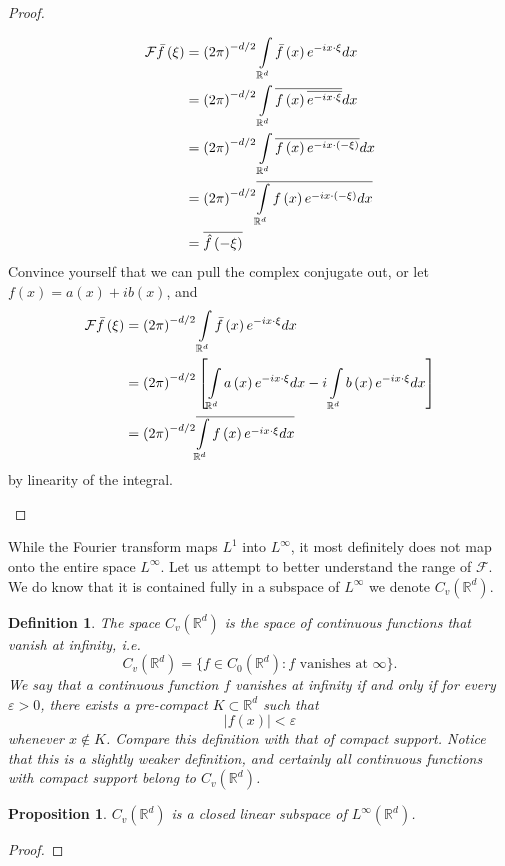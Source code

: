 \documentclass[letterpaper,twoside,12pt]{article}
\theoremstyle{mystyle}
\newtheorem{definition}{Definition}[section]
\newtheorem{prop}{Proposition}[section]
\newcommand{\R}{{\mathbb R}}
\newcommand{\cg}{\color{gray}}
\newcommand{\cbk}{\color{black}}
\begin{document}
\begin{proof}
\begin{enumerate}
\begin{align*}
      \mathcal{F}\bar f\left( \xi  \right) &= {\left( {2\pi } \right)^{ - d/2}}\int\limits_{{\mathbb{R}^d}} {\bar f\left( x \right){e^{ - ix \cdot \xi }}dx}  \hfill \\
       &= {\left( {2\pi } \right)^{ - d/2}}\int\limits_{{\mathbb{R}^d}} {\overline {f\left( x \right)\overline {{e^{ - ix \cdot \xi }}} } dx}  \hfill \\
       &= {\left( {2\pi } \right)^{ - d/2}}\int\limits_{{\mathbb{R}^d}} {\overline {f\left( x \right){e^{ - ix \cdot \left( { - \xi } \right)}}} dx}  \hfill \\
       &= {\left( {2\pi } \right)^{ - d/2}}\overline {\int\limits_{{\mathbb{R}^d}} {f\left( x \right){e^{ - ix \cdot \left( { - \xi } \right)}}dx} }  \hfill \\
       &= \overline {\hat f\left( { - \xi } \right)} 
      \end{align*}
      Convince yourself that we can pull the complex conjugate out, or let $f(x) = a(x) + ib(x)$, and 
      \begin{align*}
        \mathcal{F}\bar f\left( \xi  \right) &= {\left( {2\pi } \right)^{ - d/2}}\int\limits_{{\mathbb{R}^d}} {\bar f\left( x \right){e^{ - ix \cdot \xi }}dx}  \hfill \\
         &= {\left( {2\pi } \right)^{ - d/2}}\left[ {\int\limits_{{\mathbb{R}^d}} {a\left( x \right){e^{ - ix \cdot \xi }}dx}  - i\int\limits_{{\mathbb{R}^d}} {b\left( x \right){e^{ - ix \cdot \xi }}dx} } \right] \hfill \\
         &= {\left( {2\pi } \right)^{ - d/2}}\overline {\int\limits_{{\mathbb{R}^d}} {f\left( x \right){e^{ - ix \cdot \xi }}dx} } 
      \end{align*}
      by linearity of the integral. 
  \end{enumerate}
\end{proof}
While the Fourier transform maps $L^1$ into $L^\infty$, it most definitely does not map onto the entire space $L^\infty$. Let us attempt to better understand the range of $\mathcal F$. We do know that it is contained fully in a subspace of $L^\infty$ we denote $C_v\left( \R^d \right)$. 
\begin{definition}
  The space $C_v\left( \R^d \right)$ is the space of continuous functions that vanish at infinity, i.e. 
  \[C_v\left( \R^d \right) = \{f \in C_0\left( \R^d \right) : f\text{ vanishes at }\infty\}.\]
  We say that a continuous function $f$ vanishes at infinity if and only if for every $\varepsilon>0$, there exists a pre-compact $K \subset \R^d$ such that 
  \[|f(x)| < \varepsilon\] whenever $x \notin K$. \cg Compare this definition with that of compact support. Notice that this is a slightly weaker definition, and certainly all continuous functions with compact support belong to $C_v\left( \R^d \right)$. \cbk 
\end{definition}
\begin{prop}
  $C_v\left( \R^d \right)$ is a closed linear subspace of $L^\infty\left( \R^d \right)$. 
\end{prop}
\begin{proof}
  
\end{proof}
\end{document}

